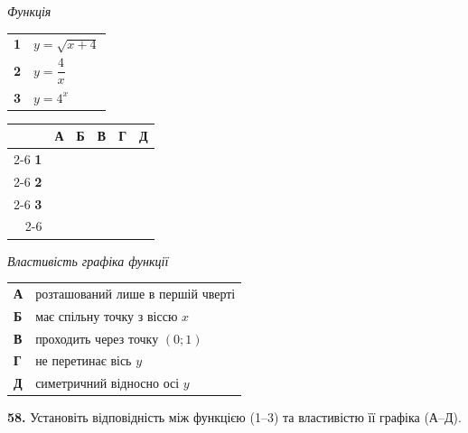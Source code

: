 \documentclass[14pt]{extarticle}
\newcommand{\answerGrid}{
    \begingroup
    \renewcommand{\arraystretch}{1.3} 
    \setlength{\tabcolsep}{7pt} 
    \begin{tabular}{r|c|c|c|c|c|}
         \multicolumn{1}{c}{} & \multicolumn{1}{c}{\textbf{А}} & \multicolumn{1}{c}{\textbf{Б}} & \multicolumn{1}{c}{\textbf{В}} & \multicolumn{1}{c}{\textbf{Г}} & \multicolumn{1}{c}{\textbf{Д}} \\ \cline{2-6}
         \textbf{1} & & & & & \\ \cline{2-6}
         \textbf{2} & & & & & \\ \cline{2-6}
         \textbf{3} & & & & & \\ \cline{2-6}
    \end{tabular}
    \endgroup
}
\begin{document}
\noindent
\begin{minipage}[t]{0.45\textwidth}
    \textit{Функція} \par \vspace{0.2cm}
    \begin{tabular}{@{}p{0.5cm} l@{}}
    \textbf{1} & $y=\sqrt{x+4}$ \\[0.4cm]
    \textbf{2} & $y=\dfrac{4}{x}$ \\[0.4cm]
    \textbf{3} & $y=4^x$ \\
    \end{tabular}

    \vspace{1.0cm}
    \answerGrid
\end{minipage}%
\hfill
\begin{minipage}[t]{0.50\textwidth}
    \textit{Властивість графіка функції} \par \vspace{0.2cm}
    \begin{tabular}{@{}p{0.5cm} p{7cm}@{}}
    \textbf{А} & розташований лише в першій чверті \\[0.2cm]
    \textbf{Б} & має спільну точку з віссю $x$ \\[0.2cm]
    \textbf{В} & проходить через точку $(0; 1)$ \\[0.2cm]
    \textbf{Г} & не перетинає вісь $y$ \\[0.2cm]
    \textbf{Д} & симетричний відносно осі $y$ \\
    \end{tabular}
\end{minipage}

\vspace{0.7cm}

\noindent\textbf{58.} Установіть відповідність між функцією (1--3) та властивістю її графіка (А--Д).

\vspace{0.3cm}
\end{document}
